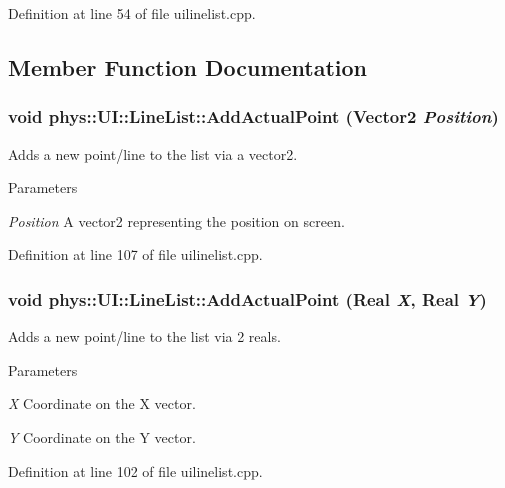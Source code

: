 Definition at line 54 of file uilinelist.cpp.



\subsection{Member Function Documentation}
\hypertarget{classphys_1_1UI_1_1LineList_ac7981508110779a12e3b80d0d57df755}{
\subsubsection[{AddActualPoint}]{\setlength{\rightskip}{0pt plus 5cm}void phys::UI::LineList::AddActualPoint ({\bf Vector2} {\em Position})}}
\label{d7/de8/classphys_1_1UI_1_1LineList_ac7981508110779a12e3b80d0d57df755}


Adds a new point/line to the list via a vector2. 


\begin{DoxyParams}{Parameters}
\item[{\em Position}]A vector2 representing the position on screen. \end{DoxyParams}


Definition at line 107 of file uilinelist.cpp.

\hypertarget{classphys_1_1UI_1_1LineList_a7e1b7d1f3e647e3fe2d4c7868268b0e3}{
\subsubsection[{AddActualPoint}]{\setlength{\rightskip}{0pt plus 5cm}void phys::UI::LineList::AddActualPoint ({\bf Real} {\em X}, \/  {\bf Real} {\em Y})}}
\label{d7/de8/classphys_1_1UI_1_1LineList_a7e1b7d1f3e647e3fe2d4c7868268b0e3}


Adds a new point/line to the list via 2 reals. 


\begin{DoxyParams}{Parameters}
\item[{\em X}]Coordinate on the X vector. \item[{\em Y}]Coordinate on the Y vector. \end{DoxyParams}


Definition at line 102 of file uilinelist.cpp.

